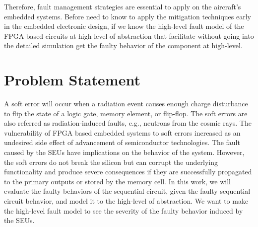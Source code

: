 %

Therefore, fault management strategies are essential to apply on the aircraft's embedded systems. Before need to know to apply the mitigation techniques early in the embedded electronic design, if we know the high-level fault model of the FPGA-based circuits at high-level of abstraction that facilitate without going into the detailed simulation get the faulty behavior of the component at high-level.

  

\section{Problem Statement}

A soft error will occur when a radiation event causes enough charge disturbance to flip the state of a logic gate, memory element, or flip-flop. The soft errors are also referred as radiation-induced faults, e.g., neutrons from the cosmic rays. The vulnerability of FPGA based embedded systems to soft errors increased as an undesired side effect of advancement of semiconductor technologies. The fault caused by the SEUs have implications on the behavior of the system. However, the soft errors do not break the silicon but can corrupt the underlying functionality and produce severe consequences if they are successfully propagated to the primary outputs or stored by the memory cell. In this work, we will evaluate the faulty behaviors of the sequential circuit, given the faulty sequential circuit behavior, and model it to the high-level of abstraction. We want to make the high-level fault model to see the severity of the faulty behavior induced by the SEUs.







